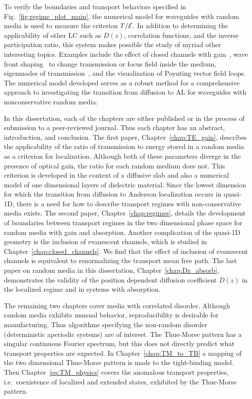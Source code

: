 
To verify the boundaries and transport behaviors specified in Fig.~\ref{fig:regime_plot_main}, the numerical model for waveguides with random media is used to measure the criterion $T/{\cal E}$. In addition to determining the applicability of other LC such as $D(z)$, correlation functions, and the inverse participation ratio, this system makes possible the study of myriad other interesting topics. Examples include the effect of closed channels with gain~\cite{2010_Payne_closed}, wave front shaping~\cite{2008_Vellekoop_Mosk} to change transmission or focus field inside the medium, eigenmodes of transmission~\cite{1986_Imry}, and the visualization of Poynting vector field loops. The numerical model developed serves as a robust method for a comprehensive approach to investigating the transition from diffusion to AL for waveguides with nonconservative random media.

In this dissertation, each of the chapters are either published or in the process of submission to a peer-reviewed journal. Thus each chapter has an abstract, introduction, and conclusion. The first paper, Chapter~\ref{chap:TE_gain}, describes the applicability of the ratio of transmission to energy stored in a random media as a criterion for localization. Although both of these parameters diverge in the presence of optical gain, the ratio for each random medium does not. This criterion is developed in the context of a diffusive slab and also a numerical model of one dimensional layers of dielectric material. Since the lowest dimension for which the transition from diffusion to Anderson localization occurs in quasi-1D, there is a need for how to describe transport regimes with non-conservative media exists. The second paper, Chapter~\ref{chap:regimes}, details the development of boundaries between transport regimes in the two dimensional phase space for random media with gain and absorption. Another complication of the quasi-1D geometry is the inclusion of evanescent channels, which is studied in Chapter~\ref{chap:closed_channels}. We find that the effect of inclusion of evanescent channels is equivalent to renormalizing the transport mean free path. The last paper on random media in this dissertation, Chapter~\ref{chap:Dz_absorb}, demonstrates the validity of the position dependent diffusion coefficient $D(z)$ in the localized regime and in systems with absorption.

The remaining two chapters cover media with correlated disorder. Although random media exhibits unusual behavior, reproducibility is desirable for manufacturing. Thus algorithms specifying the non-random disorder (deterministic aperiodic systems) are of interest. The Thue-Morse pattern has a singular continuous Fourier spectrum, but this does not directly predict what transport properties are expected. In Chapter~\ref{chap:TM_to_TB} a mapping of the two dimensional Thue-Morse pattern is made to the tight-binding model. Then Chapter~\ref{eq:TM_physics} covers the anomalous transport properties, i.e.~coexistence of localized and extended states, exhibited by the Thue-Morse pattern.

